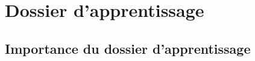 \documentclass[parskip=half-, numbers=enddot, DIV=15]{scrartcl}
\begin{document}

\section{Dossier d'apprentissage}

\subsection{Importance du dossier d'apprentissage}
\end{document}
